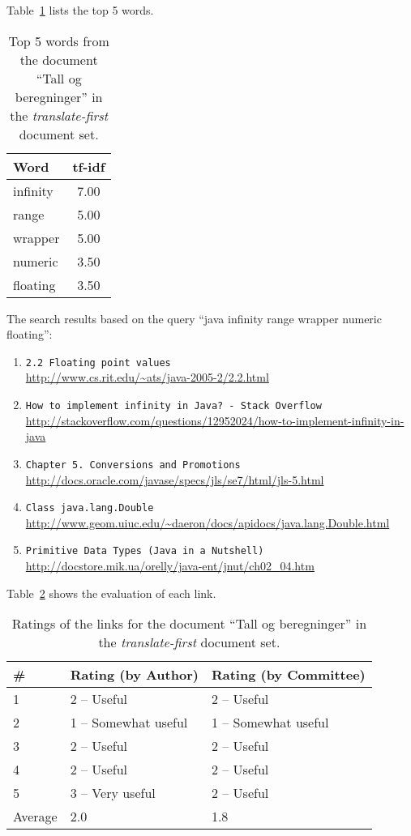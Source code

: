 Table~\ref{tab:topWords-en-tall-og-beregninger-2} lists the top 5 words.
\begin{table}[H]
\centering
\begin{tabular}{|l|c|}
\hline\hline
    Word & tf-idf \\
\hline
    infinity & 7.00 \\
    range & 5.00 \\
    wrapper & 5.00 \\
    numeric & 3.50 \\
    floating & 3.50 \\
\hline\hline
\end{tabular}
\caption{Top 5 words from the document ``Tall og beregninger'' in the \textit{translate-first} document set.}
\label{tab:topWords-en-tall-og-beregninger-2}
\end{table}

The search results based on the query ``java infinity range wrapper numeric floating'':

\begin{enumerate}
\item
    \verb|2.2 Floating point values| \\
    \url{http://www.cs.rit.edu/~ats/java-2005-2/2.2.html}
\item
    \verb|How to implement infinity in Java? - Stack Overflow| \\
    \url{http://stackoverflow.com/questions/12952024/how-to-implement-infinity-in-java}
\item
    \verb|Chapter 5. Conversions and Promotions| \\
    \url{http://docs.oracle.com/javase/specs/jls/se7/html/jls-5.html}
\item
    \verb|Class java.lang.Double| \\
    \url{http://www.geom.uiuc.edu/~daeron/docs/apidocs/java.lang.Double.html}
\item
    \verb|Primitive Data Types (Java in a Nutshell)| \\
    \url{http://docstore.mik.ua/orelly/java-ent/jnut/ch02_04.htm}
\end{enumerate}

Table~\ref{tab:ratings-en-tall-og-beregninger-2} shows the evaluation of each link.
\begin{table}[H]
\centering
\begin{tabular}{|l|l|l|}
\hline\hline
    \# & Rating (by Author) & Rating (by Committee) \\
\hline
    1 & 2 -- Useful & 2 -- Useful \\
    2 & 1 -- Somewhat useful & 1 -- Somewhat useful \\
    3 & 2 -- Useful & 2 -- Useful \\
    4 & 2 -- Useful & 2 -- Useful \\
    5 & 3 -- Very useful & 2 -- Useful \\
\hline
    Average & 2.0 & 1.8 \\
\hline\hline
\end{tabular}
\caption{Ratings of the links for the document ``Tall og beregninger'' in the \textit{translate-first} document set.}
\label{tab:ratings-en-tall-og-beregninger-2}
\end{table}
